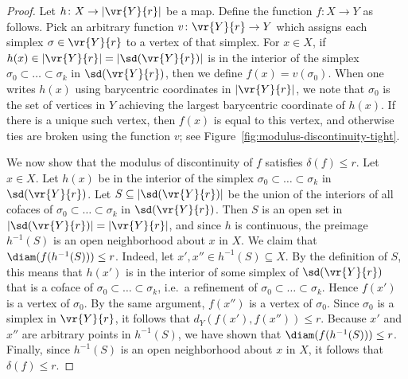 \documentclass[11pt, reqno, english]{amsart}
\begin{document}
\begin{proof}
Let $h\colon X\to |\vr{Y}{r}|$ be a map.
Define the function $f\colon X\to Y$ as follows.
Pick an arbitrary function $v\colon \vr{Y}{r}\to Y$ which assigns each simplex $\sigma\in\vr{Y}{r}$ to a vertex of that simplex.
For $x\in X$, if $h(x)\in |\vr{Y}{r}|=|\sd(\vr{Y}{r})|$ is in the interior of the simplex $\sigma_0 \subset \ldots \subset \sigma_k$ in $\sd(\vr{Y}{r})$, then we define $f(x)=v(\sigma_0)$.
When one writes $h(x)$ using barycentric coordinates in $|\vr{Y}{r}|$, we note that $\sigma_0$ is the set of vertices in $Y$ achieving the largest barycentric coordinate of $h(x)$.
If there is a unique such vertex, then $f(x)$ is equal to this vertex, and otherwise ties are broken using the function $v$; see Figure~\ref{fig:modulus-discontinuity-tight}.

We now show that the modulus of discontinuity of $f$ satisfies $\delta(f)\le r$.
Let $x\in X$.
Let $h(x)$ be in the interior of the simplex $\sigma_0 \subset \ldots \subset \sigma_k$ in $\sd(\vr{Y}{r})$.
Let $S\subseteq|\sd(\vr{Y}{r})|$ be the union of the interiors of all cofaces of $\sigma_0 \subset \ldots \subset \sigma_k$ in $\sd(\vr{Y}{r})$.
Then $S$ is an open set in $|\sd(\vr{Y}{r})|=|\vr{Y}{r}|$, and since $h$ is continuous, the preimage $h^{-1}(S)$ is an open neighborhood about $x$ in $X$.
We claim that $\diam(f(h^{-1}(S)))\le r$.
Indeed, let $x',x''\in h^{-1}(S)\subseteq X$.
By the definition of $S$, this means that $h(x')$ is in the interior of some simplex of $\sd(\vr{Y}{r})$ that is a coface of $\sigma_0 \subset \ldots \subset \sigma_k$, i.e.\ a refinement of $\sigma_0 \subset \ldots \subset \sigma_k$.
Hence $f(x')$ is a vertex of $\sigma_0$.
By the same argument, $f(x'')$ is a vertex of $\sigma_0$.
Since $\sigma_0$ is a simplex in $\vr{Y}{r}$, it follows that $d_{Y}(f(x'),f(x''))\le r$.
Because $x'$ and $x''$ are arbitrary points in $h^{-1}(S)$, we have shown that $\diam(f(h^{-1}(S)))\le r$.
Finally, since $h^{-1}(S)$ is an open neighborhood about $x$ in $X$, it follows that $\delta(f)\le r$.
\end{proof}
\end{document}
